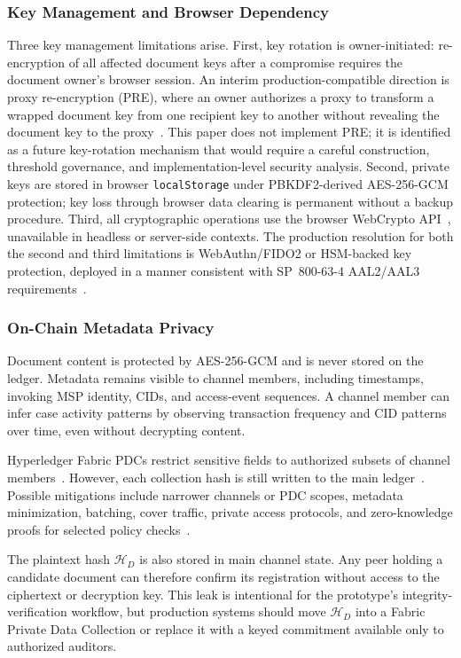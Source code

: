 \documentclass[preprint,12pt]{elsarticle}
\begin{document}
\subsubsection{Key Management and Browser Dependency}
Three key management limitations arise. First, key rotation is
owner-initiated: re-encryption of all affected document keys after a
compromise requires the document owner's browser session. An interim
production-compatible direction is proxy re-encryption
(PRE), where an owner authorizes a proxy to transform a wrapped
document key from one recipient key to another without revealing the
document key to the proxy~\cite{ateniese2017redactable,nist80057,nist80053}.
This paper does not implement PRE; it is identified as a future
key-rotation mechanism that would require a careful construction,
threshold governance, and implementation-level security analysis. Second,
private keys are stored in browser \texttt{localStorage} under
PBKDF2-derived AES-256-GCM protection; key loss through browser data
clearing is permanent without a backup procedure. Third, all
cryptographic operations use the browser WebCrypto
API~\cite{w3cWebCrypto}, unavailable in headless or server-side
contexts. The production resolution for both the second and third
limitations is WebAuthn/FIDO2 or HSM-backed key protection, deployed
in a manner consistent with SP~800-63-4 AAL2/AAL3
requirements~\cite{nist800634,w3cWebAuthnL3,nist800131a,fips1403}.

\subsubsection{On-Chain Metadata Privacy}
Document content is protected by AES-256-GCM and is never stored on the
ledger. Metadata remains visible to channel members, including timestamps,
invoking MSP identity, CIDs, and access-event sequences. A channel member
can infer case activity patterns by observing transaction frequency and CID
patterns over time, even without decrypting content.

Hyperledger Fabric PDCs restrict sensitive fields to authorized subsets of
channel members~\cite{fabricPDCDoc,fabricChannelsDoc}. However, each
collection hash is still written to the main ledger~\cite{politou2019metadata}.
Possible mitigations include narrower channels or PDC scopes, metadata
minimization, batching, cover traffic, private access protocols, and
zero-knowledge proofs for selected policy checks~\cite{groth2016}.

The plaintext hash \(\mathcal{H}_D\) is also stored in main channel state.
Any peer holding a candidate document can therefore confirm its registration
without access to the ciphertext or decryption key. This leak is intentional
for the prototype's integrity-verification workflow, but production systems
should move \(\mathcal{H}_D\) into a Fabric Private Data Collection or
replace it with a keyed commitment available only to authorized auditors.
\end{document}
